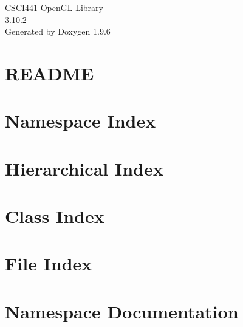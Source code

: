 \documentclass[twoside]{book}
\newcommand{\+}{\discretionary{\mbox{\scriptsize$\hookleftarrow$}}{}{}}
\newcommand{\clearemptydoublepage}{%
    \newpage{\pagestyle{empty}\cleardoublepage}%
  }
\begin{document}
  \raggedbottom
    \hypersetup{pageanchor=false,
                bookmarksnumbered=true,
                pdfencoding=unicode
               }
  \begin{titlepage}
  \vspace*{7cm}
  \begin{center}%
  {\Large CSCI441 Open\+GL Library}\\
  [1ex]\large 3.\+10.\+2 \\
  \vspace*{1cm}
  {\large Generated by Doxygen 1.9.6}\\
  \end{center}
  \end{titlepage}
  \clearemptydoublepage
  \tableofcontents
  \clearemptydoublepage
  \hypersetup{pageanchor=true}
\chapter{README}
\label{md__r_e_a_d_m_e}

\chapter{Namespace Index}

\chapter{Hierarchical Index}

\chapter{Class Index}

\chapter{File Index}

\chapter{Namespace Documentation}









\end{document}

